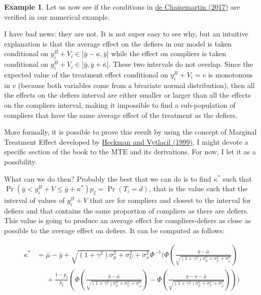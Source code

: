 \documentclass[
]{book}
\theoremstyle{definition}
\theoremstyle{definition}
\newtheorem{example}{Example}[chapter]
\theoremstyle{definition}
\theoremstyle{definition}
\theoremstyle{remark}
\begin{document}
\begin{example}
\protect\hypertarget{exm:unnamed-chunk-149}{}{\label{exm:unnamed-chunk-149} }Let us now see if the conditions in \href{https://drive.google.com/file/d/16XWlDECIvreM7l_NHe-JkXgyuPhFT1QG/view}{de Chaisemartin (2017)} are verified in our numerical example.
\end{example}
I have bad news: they are not.
It is not super easy to see why, but an intuitive explanation is that the average effect on the defiers in our model is taken conditional on \(y^B_i+V_i\in]\bar{y}-\underline{\kappa},\bar{y}]\) while the effect on compliers is taken conditional on \(y^B_i+V_i\in]\bar{y},\bar{y}+\bar{\kappa}]\).
These two intervals do not overlap.
Since the expected value of the treatment effect conditional on \(y^B_i+V_i=v\) is monotonous in \(v\) (because both variables come from a bivariate normal distribution), then all the effects on the defiers interval are either smaller or larger than all the effects on the compliers interval, making it impossible to find a sub-population of compliers that have the same average effect of the treatment as the defiers.

More formally, it is possible to prove this result by using the concept of Marginal Treatment Effect developed by \href{https://www.pnas.org/content/pnas/96/8/4730.full.pdf}{Heckman and Vytlacil (1999)}. I might devote a specific section of the book to the MTE and its derivations.
For now, I let it as a possibility.

What can we do then?
Probably the best that we can do is to find \(\kappa^*\) such that \(\Pr(\bar{y}<y_i^B+V\leq\bar{y}+\kappa^*)p_{\xi}=\Pr(T_i=d)\), that is the value such that the interval of values of \(y_i^B+V\) that are for compliers and closest to the interval for defiers and that contains the same proportion of compliers as there are defiers.
This value is going to produce an average effect for compliers-defiers as close as possible to the average effect on defiers.
It can be computed as follows:

\begin{align*}
  \kappa^* & = \bar{\mu}-\bar{y}+\sqrt{(1+\gamma^2)\sigma^2_{\mu}+\sigma^2_U+\sigma^2_{\omega}}
                                  \Phi^{-1}\Bigg(\Phi\left(\frac{\bar{y}-\bar{\mu}}{\sqrt{(1+\gamma^2)\sigma^2_{\mu}+\sigma^2_U+\sigma^2_{\omega}}}\right)\\
           & \phantom{=}+\frac{1-p_{\xi}}{p_{\xi}}\left(\Phi\left(\frac{\bar{y}-\bar{\mu}}{\sqrt{(1+\gamma^2)\sigma^2_{\mu}+\sigma^2_U+\sigma^2_{\omega}}}\right)-\Phi\left(\frac{\bar{y}-\underline{\kappa}-\bar{\mu}}{\sqrt{(1+\gamma^2)\sigma^2_{\mu}+\sigma^2_U+\sigma^2_{\omega}}}\right)\right)\Bigg)
 \end{align*}
\end{document}
